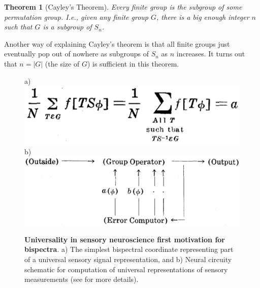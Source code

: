 \documentclass[letterpaper, 10pt]{article}
\newtheorem{theorem}{Theorem}[section]
\theoremstyle{definition}
\begin{document}
\begin{theorem}[Cayley's Theorem]
Every finite group is the subgroup of some permutation group.  I.e., given any finite group $G$, there is a big enough integer $n$ such that $G$ is a subgroup of $S_n$.  
\end{theorem}
Another way of explaining Cayley's theorem is that all finite groups just eventually pop out of nowhere as subgroups of $S_n$ as $n$ increases.
It turns out that $n = |G|$ (the size of $G$) is sufficient in this theorem. 

\begin{figure}[t!]
 \begin{center}
a)  \includegraphics[width=.45 \linewidth]{figs/pitts_1947_first_bispect_coeff.png}  
b) \includegraphics[width=.45 \linewidth]{figs/pitts_1947_diagram.png}   
\caption{\textbf{Universality in sensory neuroscience first motivation for bispectra}. a) The simplest bispectral coordinate representing part of a universal sensory signal representation, and b) Neural circuity schematic for computation of universal representations of sensory measurements (see \cite{pitts1947} for more details).}
\label{pitts_bispectra}
\end{center}
\end{figure}
\end{document}
